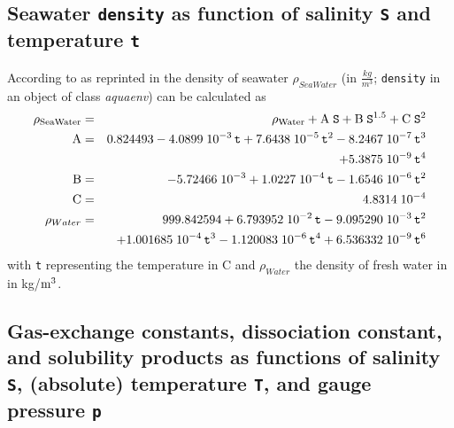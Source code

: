\documentclass[a4paper]{article}
\begin{document}
\subsection{Seawater \texttt{density} as function of salinity \texttt{S} and temperature \texttt{t}}
According to \citep{Millero1981} as reprinted in \citet[chap. 5, p. 6f]{DOE1994} the density of seawater $\rho_{SeaWater}$ (in $\frac{kg}{m^3}$; \texttt{density} in an object of class \textit{aquaenv}) can be calculated as
\begin{eqnarray}
\rm \rho_{SeaWater} &=&\rm \rho_{Water} + A\;\mbox{\texttt{S}} + B\;\mbox{\texttt{S}}^{1.5} + C\; \mbox{\texttt{S}}^2\\
\rm A &=& \rm 0.824493 - 4.0899 \; 10^{-3} \, \mbox{\texttt{t}} + 7.6438 \; 10^{-5} \, \mbox{\texttt{t}}^2 - 8.2467 \; 10^{-7}  \,\mbox{\texttt{t}}^3\\
  && \rm + 5.3875 \; 10^{-9} \, \mbox{\texttt{t}}^4\\
\rm B &=& \rm -5.72466 \; 10^{-3} + 1.0227 \; 10^{-4} \, \mbox{\texttt{t}} - 1.6546\; 10^{-6} \, \mbox{\texttt{t}}^2 \\
\rm C &=& 4.8314\;10^{-4} \\
\rho_{Water} &=& 999.842594 + 6.793952\;10^{-2} \, \mbox{\texttt{t}} - 9.095290\;10^{-3} \, \mbox{\texttt{t}}^2\\
                                    && + 1.001685\;10^{-4}\,\mbox{\texttt{t}}^3 - 1.120083\;10^{-6} \, \mbox{\texttt{t}}^4 + 6.536332\;10^{-9} \, \mbox{\texttt{t}}^6
\end{eqnarray}
\noindent
with \texttt{t} representing the temperature in \textdegree$ $C and $\rho_{Water}$ the density of fresh water in in kg/$\rm m^3$.

\subsection{Gas-exchange constants, dissociation constant, and solubility products as functions of salinity \texttt{S}, (absolute) temperature \texttt{T}, and gauge pressure \texttt{p}}
\end{document}
